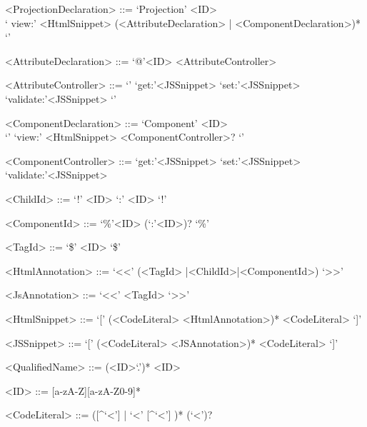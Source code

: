 \documentclass{article}
\begin{document}
{\begin{grammar}
<ProjectionDeclaration> ::= `Projection' <ID> \\ `{ view:' <HtmlSnippet> (<AttributeDeclaration> | <ComponentDeclaration>)* `}'

<AttributeDeclaration> ::= `@'<ID> <AttributeController>

<AttributeController> ::= `{' `get:'<JSSnippet> `set:'<JSSnippet> `validate:'<JSSnippet> `}'

<ComponentDeclaration> ::= `Component' <ID> \\`{' `view:' <HtmlSnippet> <ComponentController>? `}'

<ComponentController> ::= `get:'<JSSnippet> `set:'<JSSnippet> `validate:'<JSSnippet> 
 
<ChildId> ::= `!' <ID> `:' <ID> `!'
 
<ComponentId> ::= `\%'<ID> (`:'<ID>)? `\%'

<TagId> ::= `\$' <ID> `\$' 

<HtmlAnnotation> ::= `<<' (<TagId> |<ChildId>|<ComponentId>) `>>'

<JsAnnotation> ::= `<<' <TagId> `>>'

<HtmlSnippet> ::= `[' (<CodeLiteral> <HtmlAnnotation>)*  <CodeLiteral> `]'

<JSSnippet> ::= `[' (<CodeLiteral> <JSAnnotation>)*  <CodeLiteral> `]'

<QualifiedName> ::= (<ID>`.')* <ID>

<ID> ::= [a-zA-Z][a-zA-Z0-9]*

<CodeLiteral> ::= ([\^{}`<'] | `<' [\^{}`<'] )* (`<')?


\end{grammar}

}
\end{document}
